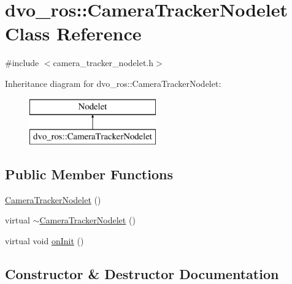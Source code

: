 \hypertarget{classdvo__ros_1_1_camera_tracker_nodelet}{}\section{dvo\+\_\+ros\+:\+:Camera\+Tracker\+Nodelet Class Reference}
\label{classdvo__ros_1_1_camera_tracker_nodelet}


{\ttfamily \#include $<$camera\+\_\+tracker\+\_\+nodelet.\+h$>$}

Inheritance diagram for dvo\+\_\+ros\+:\+:Camera\+Tracker\+Nodelet\+:\begin{figure}[H]
\begin{center}
\leavevmode
\includegraphics[height=2.000000cm]{classdvo__ros_1_1_camera_tracker_nodelet}
\end{center}
\end{figure}
\subsection*{Public Member Functions}
\begin{DoxyCompactItemize}
\item 
\mbox{\hyperlink{classdvo__ros_1_1_camera_tracker_nodelet_a7320ee469172ee85ebbdeb470cc11d15}{Camera\+Tracker\+Nodelet}} ()
\item 
virtual \mbox{\hyperlink{classdvo__ros_1_1_camera_tracker_nodelet_a8189fa86e3b8bfbd2397b47b4dfa17d7}{$\sim$\+Camera\+Tracker\+Nodelet}} ()
\item 
virtual void \mbox{\hyperlink{classdvo__ros_1_1_camera_tracker_nodelet_a62ab6e4908aa2547c60e0247bb4cb2e3}{on\+Init}} ()
\end{DoxyCompactItemize}


\subsection{Constructor \& Destructor Documentation}
\mbox{\label{classdvo__ros_1_1_camera_tracker_nodelet_a7320ee469172ee85ebbdeb470cc11d15}} 
